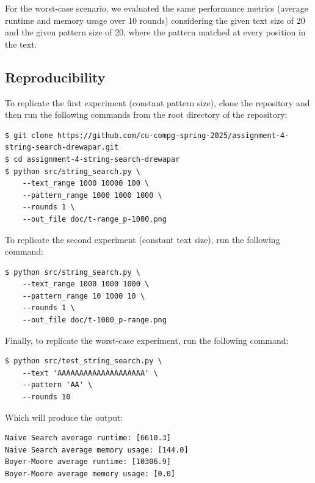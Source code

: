 \documentclass[11pt, letterpaper]{article}
\begin{document}
For the worst-case scenario, we evaluated the same performance metrics (average runtime and memory usage over 10 rounds) considering the given text size of 20 and the given pattern size of 20, where the pattern matched at every position in the text.

\subsection{Reproducibility}
To replicate the first experiment (constant pattern size), clone the repository and then run the
following commands from the root directory of the repository:
\begin{verbatim}
$ git clone https://github.com/cu-compg-spring-2025/assignment-4-string-search-drewapar.git
$ cd assignment-4-string-search-drewapar
$ python src/string_search.py \
    --text_range 1000 10000 100 \
    --pattern_range 1000 1000 1000 \
    --rounds 1 \
    --out_file doc/t-range_p-1000.png
\end{verbatim}


\noindent To replicate the second experiment (constant text size), run the following command:
\begin{verbatim}
$ python src/string_search.py \
    --text_range 1000 1000 1000 \
    --pattern_range 10 1000 10 \
    --rounds 1 \
    --out_file doc/t-1000_p-range.png
\end{verbatim}


\noindent Finally, to replicate the worst-case experiment, run the following command:
\begin{verbatim}
$ python src/test_string_search.py \
    --text 'AAAAAAAAAAAAAAAAAAAA' \
    --pattern 'AA' \
    --rounds 10 
\end{verbatim}
Which will produce the output:
\begin{verbatim}
Naive Search average runtime: [6610.3]
Naive Search average memory usage: [144.0]
Boyer-Moore average runtime: [10306.9]
Boyer-Moore average memory usage: [0.0]
\end{verbatim}
\end{document}
